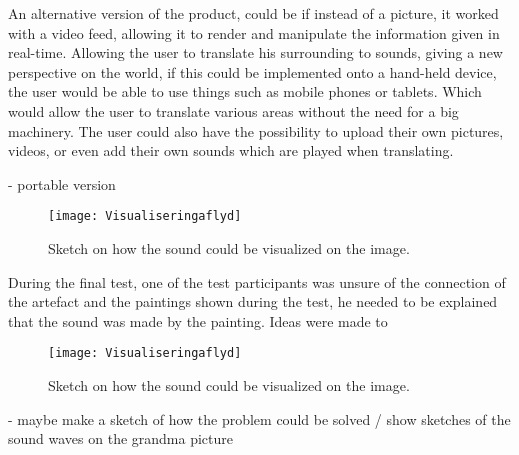 An alternative version of the product, could be if instead of a picture, it worked with a video feed, allowing it to render and manipulate the information given in real-time. Allowing the user to translate his surrounding to sounds, giving a new perspective on the world, if this could be implemented onto a hand-held device, the user would be able to use things such as mobile phones or tablets. Which would allow the user to translate various areas without the need for a big machinery. 
The user could also have the possibility to upload their own pictures, videos, or even add their own sounds which are played when translating. 

- portable version
\begin{figure}[!h] 
\centering
\texttt{[image: Visualiseringaflyd]}
\caption{\label{fig:Visualiseringaflyd} Sketch on how the sound could be visualized on the image.}
\end{figure}




During the final test, one of the test participants was unsure of the connection of the artefact and the paintings shown during the test, he needed to be explained that the sound was made by the painting. Ideas were made to 

\begin{figure}[!h] 
\centering
\texttt{[image: Visualiseringaflyd]}
\caption{\label{fig:Visualiseringaflyd} Sketch on how the sound could be visualized on the image.}
\end{figure}
 
 - maybe make a sketch of how the problem could be solved / show sketches of the sound waves on the grandma picture 
